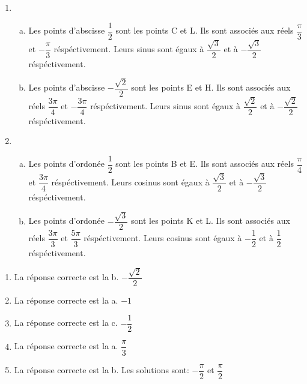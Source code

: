 \documentclass[12pt, a4paper]{article}
\begin{document}
\begin{Exercise}[number={61}]
    \begin{enumerate}
        \item   \begin{enumerate}[a)]
                \item Les points d'abscisse $\dfrac{1}{2}$ sont les points C et L. Ils sont associés aux réels $\dfrac{\pi}{3}$ et $-\dfrac{\pi}{3}$ réspéctivement. Leurs sinus sont égaux à $\dfrac{\sqrt{3}}{2}$ et à $-\dfrac{\sqrt{3}}{2}$ réspéctivement.
                \item Les points d'abscisse $-\dfrac{\sqrt{2}}{2}$ sont les points E et H. Ils sont associés aux réels $\dfrac{3\pi}{4}$ et $-\dfrac{3\pi}{4}$ réspéctivement. Leurs sinus sont égaux à $\dfrac{\sqrt{2}}{2}$ et à $-\dfrac{\sqrt{2}}{2}$ réspéctivement.
                \end{enumerate}
        \item   \begin{enumerate}[a)]
                \item Les points d'ordonée $\dfrac{1}{2}$ sont les points B et E. Ils sont associés aux réels $\dfrac{\pi}{4}$ et $\dfrac{3\pi}{4}$ réspéctivement. Leurs cosinus sont égaux à $\dfrac{\sqrt{3}}{2}$ et à $-\dfrac{\sqrt{3}}{2}$ réspéctivement.
                \item Les points d'ordonée $-\dfrac{\sqrt{3}}{2}$ sont les points K et L. Ils sont associés aux réels $\dfrac{3\pi}{3}$ et $\dfrac{5\pi}{3}$ réspéctivement. Leurs cosinus sont égaux à $-\dfrac{1}{2}$ et à $\dfrac{1}{2}$ réspéctivement.
                \end{enumerate}
    \end{enumerate}
\end{Exercise}

\begin{Exercise}[number={63}]
    \begin{enumerate}
        \item La réponse correcte est la b. $-\dfrac{\sqrt{2}}{2}$
        \item La réponse correcte est la a. $-1$
        \item La réponse correcte est la c. $-\dfrac{1}{2}$
        \item La réponse correcte est la a. $\dfrac{\pi}{3}$
        \item La réponse correcte est la b. Les solutions sont: $-\dfrac{\pi}{2}$ et $\dfrac{\pi}{2}$
    \end{enumerate}    
\end{Exercise}
\end{document}
